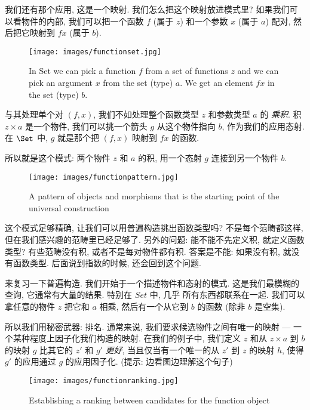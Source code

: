 我们还有那个应用, 这是一个映射. 我们怎么把这个映射放进模式里? 如果我们可以看物件的内部, 我们可以把一个函数 $f$ (属于
$z$) 和一个参数 $x$ (属于 $a$) 配对, 然后把它映射到 $f x$ (属于 $b$).

\begin{figure}[H]
  \centering\texttt{[image: images/functionset.jpg]}
  \caption{In Set we can pick a function $f$ from a set of functions $z$ and we can
    pick an argument $x$ from the set (type) $a$. We get an element $f x$ in the
    set (type) $b$.}
\end{figure}

\noindent
与其处理单个对 $(f, x)$, 我们不如处理整个函数类型 $z$ 和参数类型 $a$ 的 \emph{乘积}. 积 $z\times{}a$ 是一个物件,
我们可以挑一个箭头 $g$ 从这个物件指向 $b$, 作为我们的应用态射. 在 $\Set$ 中, $g$ 就是那个把 $(f, x)$ 映射到 $f x$ 的函数.

所以就是这个模式: 两个物件 $z$ 和 $a$ 的积, 用一个态射 $g$ 连接到另一个物件 $b$.

\begin{figure}[H]
  \centering
  \texttt{[image: images/functionpattern.jpg]}
  \caption{A pattern of objects and morphisms that is the starting point of the
    universal construction}
\end{figure}

\noindent
这个模式足够精确, 让我们可以用普遍构造挑出函数类型吗? 不是每个范畴都这样, 但在我们感兴趣的范畴里已经足够了.
另外的问题: 能不能不先定义积, 就定义函数类型? 有些范畴没有积, 或者不是每对物件都有积. 答案是不能: 如果没有积, 就没有函数类型.
后面说到指数的时候, 还会回到这个问题.

来复习一下普遍构造. 我们开始于一个描述物件和态射的模式. 这是我们最模糊的查询, 它通常有大量的结果. 特别在 $Set$ 中, 几乎
所有东西都联系在一起. 我们可以拿任意的物件 $z$ 把它和 $a$ 相乘, 然后有一个从它到 $b$ 的函数 (除非 $b$ 是空集).

所以我们用秘密武器: 排名. 通常来说, 我们要求候选物件之间有唯一的映射 --- 一个某种程度上因子化我们构造的映射. 在我们的例子中,
我们定义 $z$ 和从 $z\times{}a$ 到 $b$ 的映射 $g$ 比其它的 $z'$ 和 $g'$ \emph{更好}, 当且仅当有一个唯一的从 $z'$ 到 $z$ 的映射
$h$, 使得 $g'$ 的应用通过 $g$ 的应用因子化. (提示: 边看图边理解这个句子)

\begin{figure}[H]
  \centering
  \texttt{[image: images/functionranking.jpg]}
  \caption{Establishing a ranking between candidates for the function object}
\end{figure}

